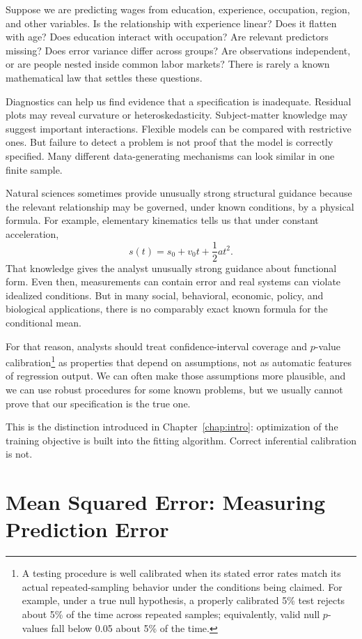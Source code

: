 \documentclass[11pt]{report}
\begin{document}
Suppose we are predicting wages from education, experience, occupation, region, and other variables. Is the relationship with experience linear? Does it flatten with age? Does education interact with occupation? Are relevant predictors missing? Does error variance differ across groups? Are observations independent, or are people nested inside common labor markets? There is rarely a known mathematical law that settles these questions.

Diagnostics can help us find evidence that a specification is inadequate. Residual plots may reveal curvature or heteroskedasticity. Subject-matter knowledge may suggest important interactions. Flexible models can be compared with restrictive ones. But failure to detect a problem is not proof that the model is correctly specified. Many different data-generating mechanisms can look similar in one finite sample.

Natural sciences sometimes provide unusually strong structural guidance because the relevant relationship may be governed, under known conditions, by a physical formula. For example, elementary kinematics tells us that under constant acceleration,
\[
s(t)=s_0+v_0t+\frac{1}{2}at^2.
\]
That knowledge gives the analyst unusually strong guidance about functional form. Even then, measurements can contain error and real systems can violate idealized conditions. But in many social, behavioral, economic, policy, and biological applications, there is no comparably exact known formula for the conditional mean.

For that reason, analysts should treat confidence-interval coverage and \(p\)-value calibration\footnote{A testing procedure is well calibrated when its stated error rates match its actual repeated-sampling behavior under the conditions being claimed. For example, under a true null hypothesis, a properly calibrated 5\% test rejects about 5\% of the time across repeated samples; equivalently, valid null \(p\)-values fall below 0.05 about 5\% of the time.} as properties that depend on assumptions, not as automatic features of regression output. We can often make those assumptions more plausible, and we can use robust procedures for some known problems, but we usually cannot prove that our specification is the true one.

This is the distinction introduced in Chapter~\ref{chap:intro}: optimization of the training objective is built into the fitting algorithm. Correct inferential calibration is not.

\section{Mean Squared Error: Measuring Prediction Error}
\end{document}
